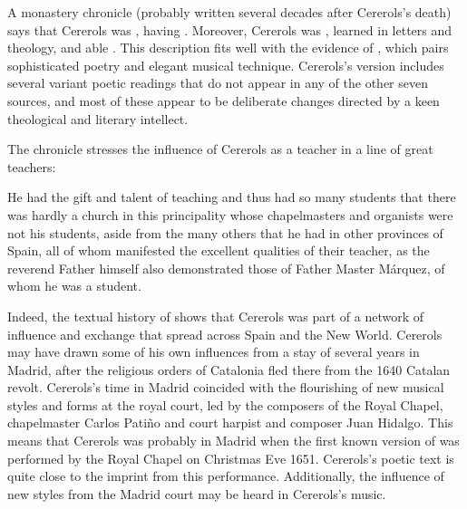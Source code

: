 A monastery chronicle (probably written several decades after Cererols's death)
says that Cererols was , having .%
    \Autocite[7, note 2]{Estrada:CererolsBio}
Moreover, Cererols was , learned in letters and
theology, and able .%
    \Autocite[7, note 2]{Estrada:CererolsBio}
This description fits well with the evidence of ,
which pairs sophisticated poetry and elegant musical technique.
Cererols's version includes several variant poetic readings that do not appear
in any of the other seven sources, and most of these appear to be deliberate
changes directed by a keen theological and literary intellect.

The chronicle stresses the influence of Cererols as a teacher in a line of great
teachers:
\begin{quoting}
    He had the gift and talent of teaching and thus had so many students that
    there was hardly a church in this principality  whose
    chapelmasters and organists were not his students, aside from the many
    others that he had in other provinces of Spain, all of whom manifested the
    excellent qualities of their teacher, as the reverend Father himself also
    demonstrated those of Father Master Márquez, of whom he  was a
    student.%
    \Autocite[7, note 2]{Estrada:CererolsBio}
\end{quoting}
Indeed, the textual history of  shows that Cererols
was part of a network of influence and exchange that spread across Spain and
the New World. 
Cererols may have drawn some of his own influences from a stay of several years
in Madrid, after the religious orders of Catalonia fled there from the 1640
Catalan revolt.
Cererols's time in Madrid coincided with the flourishing of new musical styles
and forms at the royal court, led by the composers of the Royal Chapel,
chapelmaster Carlos Patiño and court harpist and composer Juan Hidalgo.%
    \Autocites
    {Stein:Songs}
    {Rodriguez:Villancico}
This means that Cererols was probably in Madrid when the first known version of
 was performed by the Royal Chapel on Christmas Eve
1651.
Cererols's poetic text is quite close to the imprint from this performance.
Additionally, the influence of new styles from the Madrid court may be heard in
Cererols's music.

